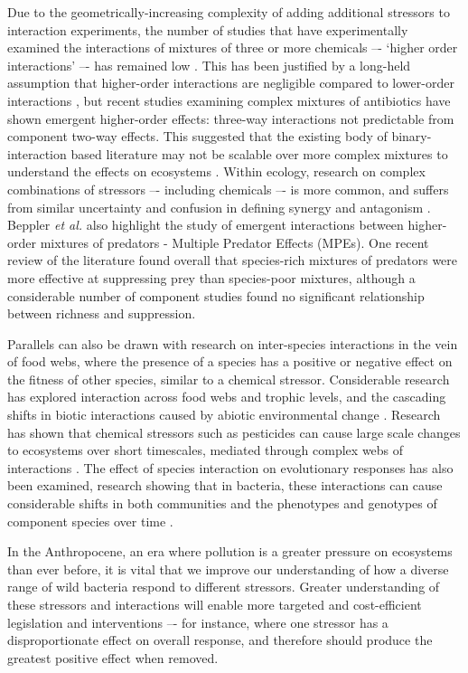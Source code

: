\documentclass[10pt]{article}
\begin{document}
Due to the geometrically-increasing complexity of adding additional stressors to interaction experiments, the number of studies that have experimentally examined the interactions of mixtures of three or more chemicals –- `higher order interactions' –- has remained low \cite{Beppler2016}. This has been justified by a long-held assumption that higher-order interactions are negligible compared to lower-order interactions \cite{Tekin2017a}, but recent studies examining complex mixtures of antibiotics have shown emergent higher-order effects: three-way interactions not predictable from component two-way effects. This suggested that the existing body of binary-interaction based literature may not be scalable over more complex mixtures to understand the effects on ecosystems \cite{Tekin2016, Zimmer2016, Tekin2017}. Within ecology, research on complex combinations of stressors –- including chemicals –- is more common, and suffers from similar uncertainty and confusion in defining synergy and antagonism \cite{Cote2016}.  Beppler \textit{et al.} also highlight the study of emergent interactions between higher-order mixtures of predators - Multiple Predator Effects (MPEs). One recent review of the literature \cite{Griffin2013EffectsMeta-analysis} found overall that species-rich mixtures of predators were more effective at suppressing prey than species-poor mixtures, although a considerable number of component studies found no significant relationship between richness and suppression. 

Parallels can also be drawn with research on inter-species interactions in the vein of food webs, where the presence of a species has a positive or negative effect on the fitness of other species, similar to a chemical stressor. Considerable research has explored interaction across food webs and trophic levels, and the  cascading shifts in biotic interactions caused by abiotic environmental change \cite{Hooper2005,Parmesan2006,Chesson2000}. Research has shown that chemical stressors such as pesticides can cause large scale changes to ecosystems over short timescales, mediated through complex webs of interactions \cite{Thompson2016}. The effect of species interaction on evolutionary responses has also been examined, research showing that in bacteria, these interactions can cause considerable shifts in both communities and the phenotypes and genotypes of component species over time \cite{Lawrence2012}.

In the Anthropocene, an era where pollution is a greater pressure on ecosystems than ever before, it is vital that we improve our understanding of how a diverse range of wild bacteria respond to different stressors. Greater understanding of these stressors and interactions will enable more targeted and cost-efficient legislation and interventions –- for instance, where one stressor has a disproportionate effect on overall response, and therefore should produce the greatest positive effect when removed. 
\end{document}
